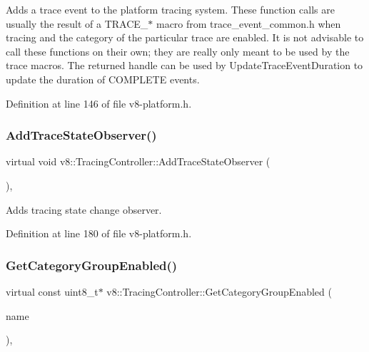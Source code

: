 Adds a trace event to the platform tracing system. These function calls are usually the result of a T\+R\+A\+C\+E\+\_\+$\ast$ macro from trace\+\_\+event\+\_\+common.\+h when tracing and the category of the particular trace are enabled. It is not advisable to call these functions on their own; they are really only meant to be used by the trace macros. The returned handle can be used by Update\+Trace\+Event\+Duration to update the duration of C\+O\+M\+P\+L\+E\+TE events. 

Definition at line 146 of file v8-\/platform.\+h.

\mbox{\label{classv8_1_1TracingController_a7b86361ffadff46018a348fd2aa01061}} 
\subsubsection{\texorpdfstring{Add\+Trace\+State\+Observer()}{AddTraceStateObserver()}}
{\footnotesize\ttfamily virtual void v8\+::\+Tracing\+Controller\+::\+Add\+Trace\+State\+Observer (\begin{DoxyParamCaption}\item[{\mbox{\hyperlink{classv8_1_1TracingController_1_1TraceStateObserver}{Trace\+State\+Observer}} $\ast$}]{ }\end{DoxyParamCaption})\hspace{0.3cm}{\ttfamily [inline]}, {\ttfamily [virtual]}}

Adds tracing state change observer. 

Definition at line 180 of file v8-\/platform.\+h.

\mbox{\label{classv8_1_1TracingController_af3c0fcec8fe93b18a89392686cfedfe5}} 
\subsubsection{\texorpdfstring{Get\+Category\+Group\+Enabled()}{GetCategoryGroupEnabled()}}
{\footnotesize\ttfamily virtual const uint8\+\_\+t$\ast$ v8\+::\+Tracing\+Controller\+::\+Get\+Category\+Group\+Enabled (\begin{DoxyParamCaption}\item[{const \mbox{\hyperlink{classchar}{char}} $\ast$}]{name }\end{DoxyParamCaption})\hspace{0.3cm}{\ttfamily [inline]}, {\ttfamily [virtual]}}

